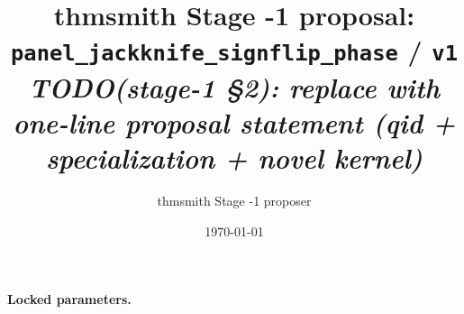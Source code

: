 \documentclass[11pt]{article}
\title{thmsmith Stage -1 proposal: \texttt{panel\_jackknife\_signflip\_phase} / \texttt{v1}%
  \\ \large\textit{TODO(stage-1 \S2): replace with one-line proposal statement (qid + specialization + novel kernel)}}
\author{thmsmith Stage -1 proposer}
\date{\today}
\theoremstyle{definition}
\theoremstyle{plain}
\theoremstyle{remark}
\begin{document}
\maketitle


\paragraph{Locked parameters.}

\begin{abstract}
\end{abstract}
\end{document}
